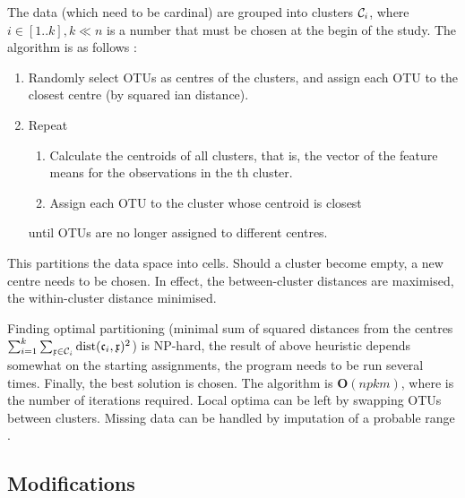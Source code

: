 \begin{refsection}
The data (which need to be cardinal) are grouped into  clusters \( \mathcal{C}_i \), where \(i \in [1..k], k \ll n \) is a number that must be chosen at the begin of the study. The algorithm is as follows \parencite{McQ-67, Har-79}:
\begin{enumerate}
   \item{Randomly select  \acs{OTU}s as centres of the clusters, and assign each \acs{OTU} to the closest centre (by squared ian distance).}
   \item{Repeat
     \begin{enumerate}
        \item{Calculate the centroids of all clusters, that is, the vector of the  feature means for the observations in the th cluster. }
        \item{Assign each \acs{OTU} to the cluster whose centroid is closest}
     \end{enumerate}
     until OTUs are no longer assigned to different centres. }
\end{enumerate}
This partitions the data space into  cells. Should a cluster become empty, a new centre needs to be chosen. In effect, the between-cluster distances are maximised, the within-cluster distance minimised.

Finding optimal partitioning (minimal sum of squared distances from the centres \( \sum_{i=1}^k \sum_{\mathfrak{x} \in \mathcal{C}_i}{\mathrm{dist}(\mathfrak{c}_i, \mathfrak{x})^2} \)) is NP-hard, the result of above heuristic depends somewhat on the starting assignments, the program needs to be run several times. Finally, the best solution is chosen. The algorithm is \( \mathbf{O}(npkm) \), where  is the number of iterations required. Local optima can be left by swapping \acs{OTU}s between clusters. Missing data can be handled by imputation of a probable range \parencite{Li-16}.


\subsection{Modifications}


\end{refsection}
